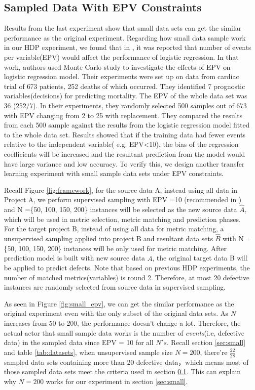 \subsection{Sampled Data With EPV Constraints}
\label{sec:EPV}
 Results from the last experiment show that small data sets can get the similar performance as the original experiment. Regarding how small data sample work in our HDP experiment,  we found that in \cite{peduzzi1996simulation}, it was reported that number of events per variable(EPV) would affect the performance of logistic regression. In that work, authors used Monte Carlo study to investigate the effects of EPV on logistic regression model. Their experiments were set up on data from cardiac trial of 673 patients, 252 deaths of which occurred. They identified 7 prognostic variables(decisions) for predicting mortality. The EPV of the whole data set was 36 (252/7). In their experiments, they randomly selected 500 samples out of 673 with EPV changing from 2 to 25 with replacement. They compared the results from each 500 sample against the results from the logistic regression model fitted to the whole data set. Results showed that if the training data had fewer events relative to the independent variable( e.g. EPV\textless10), the bias of the regression coefficients will be increased and the resultant prediction from the model would have large variance and low accuracy. To verify this, we design another transfer learning experiment with small sample data sets under EPV constraints.

Recall Figure \ref{fig:framework}, for the source data A, instead using all data in Project A, we perform supervised sampling with EPV =10 (recommended in \cite{peduzzi1996simulation})  and N =\{50, 100, 150, 200\} instances will be selected as the new source data ${\hat A}$, which will be used in metric selection, metric matching and prediction phases. For the target project B, instead of using all data for metric matching, a unsupervised sampling applied into project B and resultant data sets ${\hat B}$ with N = \{50, 100, 150, 200\} instances will be only used for metric matching. After prediction model is built with new source data $\hat A$, the original target data B will be applied to predict defects. Note that based on previous HDP experiments, the number of matched metrics(variables) is round 2. Therefore, at most 20 defective instances are randomly selected from source data in supervised sampling.

As seen in Figure \ref{fig:small_epv}, we can get the similar performance as the original experiment even with the only subset of the original data sets. As $N$ increases from 50 to 200, the performance doesn't change a lot. Therefore, the actual actor that small sample data works is the number of {\it events}(i.e, defective data) in the sampled data since EPV = 10 for all $N's$. Recall section \ref{sec:small} and table \ref{tab:datasets}, when unsupervised sample size $N=200$, there're $\frac{22}{28}$ sampled data sets containing more than 20 defective data，which means most of those sampled data sets meet the criteria used in section \ref{sec:EPV}. This can explain why $N=200$ works for our experiment in section \ref{sec:small}.





